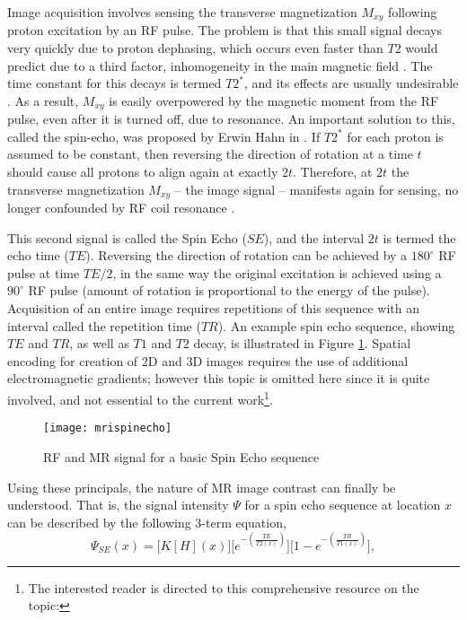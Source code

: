 Image acquisition involves sensing the transverse magnetization $M_{xy}$ following proton excitation by an RF pulse. The problem is that this small signal decays very quickly due to proton dephasing, which occurs even faster than $T2$ would predict due to a third factor, inhomogeneity in the main magnetic field \cite{Chavhan2009}. The time constant for this decays is termed $T2^*$, and its effects are usually undesirable \cite{Chavhan2009}. As a result, $M_{xy}$ is easily overpowered by the magnetic moment from the RF pulse, even after it is turned off, due to resonance. An important solution to this, called the spin-echo, was proposed by Erwin Hahn in \citeyear{Hahn1950} \cite{Hahn1950}. If $T2^*$ for each proton is assumed to be constant, then reversing the direction of rotation at a time $t$ should cause all protons to align again at exactly $2t$. Therefore, at $2t$ the transverse magnetization $M_{xy}$ -- the image signal -- manifests again for sensing, no longer confounded by RF coil resonance \cite{Hahn1950}.
\par
This second signal is called the Spin Echo ($SE$), and the interval $2t$ is termed the echo time ($TE$). Reversing the direction of rotation can be achieved by a $180^{\circ}$ RF pulse at time $TE/2$, in the same way the original excitation is achieved using a $90^{\circ}$ RF pulse (amount of rotation is proportional to the energy of the pulse). Acquisition of an entire image requires repetitions of this sequence with an interval called the repetition time ($TR$). An example spin echo sequence, showing $TE$ and $TR$, as well as $T1$ and $T2$ decay, is illustrated in Figure \ref{fig:mrispinecho}. Spatial encoding for creation of 2D and 3D images requires the use of additional electromagnetic gradients; however this topic is omitted here since it is quite involved, and not essential to the current work\footnote{The interested reader is directed to this comprehensive resource on the topic: }.
\par
\begin{figure}
  \centering\texttt{[image: mrispinecho]}
  \caption{RF and MR signal for a basic Spin Echo sequence}
  \label{fig:mrispinecho}
\end{figure}
Using these principals, the nature of MR image contrast can finally be understood. That is, the signal intensity $\Psi$ for a spin echo sequence at location $x$ can be described by the following 3-term equation,
\begin{equation}\label{eq:MRI-SE}
\Psi_{SE}(x) = \bigg[K [H](x)\bigg]\bigg[e^{-\left(\frac{TE}{T2(x)}\right)}\bigg]\bigg[1 - e^{-\left(\frac{TR}{T1(x)}\right)}\bigg],
\end{equation}
